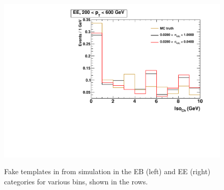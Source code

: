 \begin{figure}[!htbp]
\begin{multicols}{2}
		\includegraphics[scale=0.29]{figures/closure_test_fake_template_chIso_EE_pt200To600_sample_all.pdf} \\
    \end{multicols}
	\vspace{-0.5cm} %
  	\caption{Fake templates in \chiso from simulation in the EB (left) and EE (right) categories for various \pt bins, shown in the rows.}
  	\label{fig:all_mc_chiso_fake_templates}
\end{figure}

